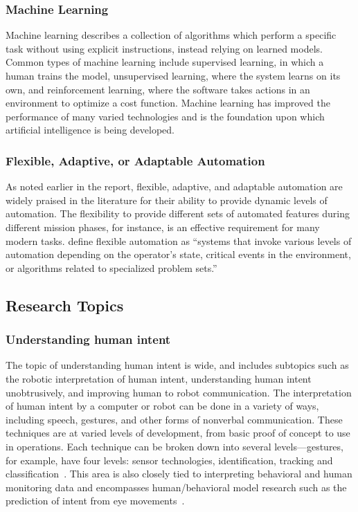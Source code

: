 \subsubsection{Machine Learning}
Machine learning describes a collection of algorithms which perform a specific task without using explicit instructions, instead relying on learned models.
Common types of machine learning include supervised learning, in which a human trains the model, unsupervised learning, where the system learns on its own, and reinforcement learning, where the software takes actions in an environment to optimize a cost function.
Machine learning has improved the performance of many varied technologies and is the foundation upon which artificial intelligence is being developed.

\subsubsection{Flexible, Adaptive, or Adaptable Automation}
As noted earlier in the report, flexible, adaptive, and adaptable automation are widely praised in the literature for their ability to provide dynamic levels of automation.
The flexibility to provide different sets of automated features during different mission phases, for instance, is an effective requirement for many modern tasks.
\citeauthor{chen_humanagent_2014} define flexible automation as ``systems that invoke various levels of automation depending on the operator's state, critical events in the environment, or algorithms related to specialized problem sets.''

\subsection{Research Topics}
\subsubsection{Understanding human intent}
The topic of understanding human intent is wide, and includes subtopics such as the robotic interpretation of human intent, understanding human intent unobtrusively, and improving human to robot communication.
The interpretation of human intent by a computer or robot can be done in a variety of ways, including speech, gestures, and other forms of nonverbal communication.
These techniques are at varied levels of development, from basic proof of concept to use in operations.
Each technique can be broken down into several levels—gestures, for example, have four levels: sensor technologies, identification, tracking and classification~\citep{liu_gesture_2018}.
This area is also closely tied to interpreting behavioral and human monitoring data and encompasses human/behavioral model research such as the prediction of intent from eye movements~\citep{ruhland_review_2015, Singh:2018:CPG:3237383.3237457}.

